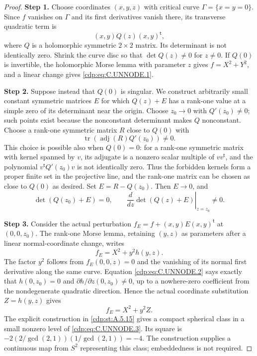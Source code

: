 \begin{proof}
\noindent\textbf{Step 1.} Choose coordinates $(x,y,z)$ with critical curve
$\Gamma=\{x=y=0\}$. Since $f$ vanishes on $\Gamma$ and
its first derivatives vanish there, its transverse
quadratic term is
\[
                  (x,y)Q(z)(x,y)^{\mathsf t},
\]
where $Q$ is a holomorphic symmetric $2\times2$ matrix.
Its determinant is not identically zero. Shrink the
curve disc so that $\det Q(z)\ne0$ for $z\ne0$.
If $Q(0)$ is invertible, the holomorphic Morse lemma
with parameter $z$ gives $f=X^2+Y^2$, and a linear
change gives \eqref{cdp:eq:C.UNNODE.1}.

\noindent\textbf{Step 2.} Suppose instead that $Q(0)$ is singular. We construct
arbitrarily small constant symmetric matrices $E$
for which $Q(z)+E$ has a rank-one value at a simple
zero of its determinant near the origin. Choose
$z_0\to0$ with $Q'(z_0)\ne0$; such points exist
because the nonconstant determinant makes $Q$
nonconstant. Choose a rank-one symmetric matrix
$R$ close to $Q(0)$ with
\[
                  \operatorname{tr}
                      (\operatorname{adj}(R)Q'(z_0))\ne0.
\]
This choice is possible also when $Q(0)=0$: for a
rank-one symmetric matrix with kernel spanned by
$v$, its adjugate is a nonzero scalar multiple of
$vv^{\mathsf t}$, and the polynomial
$v^{\mathsf t}Q'(z_0)v$ is not identically zero.
Thus the forbidden kernels form a proper finite
set in the projective line, and the rank-one
matrix can be chosen as close to $Q(0)$ as desired.
Set $E=R-Q(z_0)$. Then $E\to0$, and
\[
 \det(Q(z_0)+E)=0,\qquad
 \left.\frac{d}{dz}\det(Q(z)+E)\right|_{z=z_0}\ne0.
 \tag{C.UNNODE.2}\label{cdp:eq:C.UNNODE.2}
\]

\noindent\textbf{Step 3.} Consider the actual perturbation
$f_E=f+(x,y)E(x,y)^{\mathsf t}$ at $(0,0,z_0)$.
The rank-one Morse lemma, retaining $(y,z)$ as
parameters after a linear normal-coordinate change,
writes
\[
                         f_E=X^2+y^2h(y,z).
\]
The factor $y^2$ follows from $f_E(0,0,z)=0$ and
the vanishing of its normal first derivative along
the same curve. Equation \eqref{cdp:eq:C.UNNODE.2} says exactly
that $h(0,z_0)=0$ and $\partial h/\partial z(0,z_0)
\ne0$, up to a nowhere-zero coefficient from the
nondegenerate quadratic direction. Hence the actual
coordinate substitution $Z=h(y,z)$ gives
\[
                            f_E=X^2+y^2Z.          \tag{C.UNNODE.3}\label{cdp:eq:C.UNNODE.3}
\]
The explicit construction in \ref{cdp:st:A.5.15} gives a compact
spherical class in a small nonzero level of
\eqref{cdp:eq:C.UNNODE.3}. Its square is
$-2(2/\gcd(2,1))(1/\gcd(2,1))=-4$.
The construction supplies a continuous map from
$S^2$ representing this class; embeddedness is
not required.


\end{proof}
